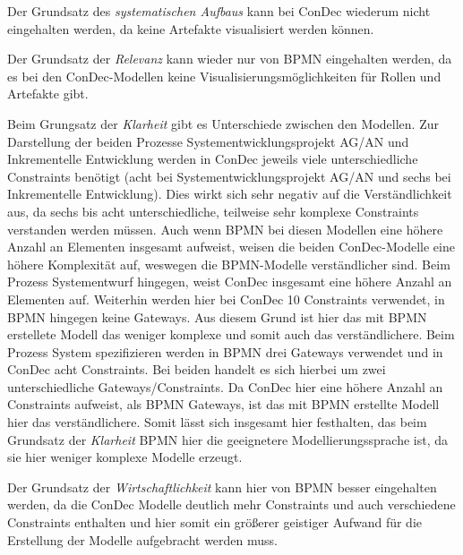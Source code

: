 Der  Grundsatz des \textit{systematischen Aufbaus} kann bei ConDec wiederum nicht eingehalten werden, da keine Artefakte visualisiert werden können.\newline

Der Grundsatz der \textit{Relevanz} kann wieder nur von BPMN eingehalten werden, da es bei den ConDec-Modellen keine Visualisierungsmöglichkeiten für Rollen und Artefakte gibt.\newline


Beim Grungsatz der \textit{Klarheit} gibt es Unterschiede zwischen den Modellen. Zur Darstellung der beiden Prozesse Systementwicklungsprojekt AG/AN und Inkrementelle Entwicklung werden in ConDec jeweils viele unterschiedliche Constraints benötigt (acht bei Systementwicklungsprojekt AG/AN und sechs bei Inkrementelle Entwicklung). Dies wirkt sich sehr negativ auf die Verständlichkeit aus, da sechs bis acht unterschiedliche, teilweise sehr komplexe Constraints verstanden werden müssen. Auch wenn BPMN bei diesen Modellen eine höhere Anzahl an Elementen insgesamt aufweist, weisen die beiden ConDec-Modelle eine höhere Komplexität auf, weswegen die BPMN-Modelle verständlicher sind. \newline
Beim Prozess Systementwurf hingegen, weist ConDec  insgesamt eine höhere Anzahl an Elementen auf. Weiterhin werden hier bei ConDec 10 Constraints verwendet, in BPMN hingegen keine Gateways. Aus diesem Grund ist hier das mit BPMN erstellete Modell das weniger komplexe und somit auch das verständlichere.\newline
Beim Prozess System spezifizieren werden in BPMN drei Gateways verwendet und in ConDec acht Constraints. Bei beiden handelt es sich hierbei um zwei unterschiedliche Gateways/Constraints. Da ConDec hier eine höhere Anzahl an Constraints aufweist, als BPMN Gateways, ist das mit BPMN erstellte Modell hier das verständlichere. \newline
Somit lässt sich insgesamt hier festhalten, das beim Grundsatz der \textit{Klarheit} BPMN hier die geeignetere Modellierungssprache ist, da sie hier weniger komplexe Modelle erzeugt.\newline

Der Grundsatz der \textit{Wirtschaftlichkeit} kann hier von BPMN besser eingehalten werden, da die ConDec Modelle deutlich mehr Constraints und auch verschiedene Constraints enthalten und hier somit ein größerer geistiger Aufwand für die Erstellung der Modelle aufgebracht werden muss.\newline


